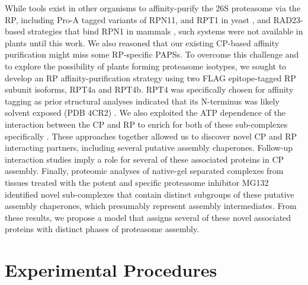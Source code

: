 	While tools exist in other organisms to affinity-purify the 26S proteasome via the RP, including Pro-A tagged variants of RPN11, and RPT1 in yeast \citep{leggett05, leggett02}, and RAD23-based strategies that bind RPN1 in mammals \citep{besche09}, such systems were not available in plants until this work. We also reasoned that our existing CP-based affinity purification might miss some RP-specific PAPSs. To overcome this challenge and to explore the possibility of plants forming proteasome isotypes, we sought to develop an RP affinity-purification strategy using two FLAG epitope-tagged RP subunit isoforms, RPT4a and RPT4b. RPT4 was specifically chosen for affinity tagging as prior structural analyses indicated that its N-terminus was likely solvent exposed (PDB 4CR2) \citep{beck12}.   We also exploited the ATP dependence of the interaction between the CP and RP to enrich for both of these sub-complexes specifically \citep{book10, liu06}. These approaches together allowed us to discover novel CP and RP interacting partners, including several putative assembly chaperones. Follow-up interaction studies imply a role for several of these associated proteins in CP assembly. Finally, proteomic analyses of native-gel separated complexes from tissues treated with the potent and specific proteasome inhibitor MG132 identified novel sub-complexes that contain distinct subgroups of these putative assembly chaperones, which presumably represent assembly intermediates. From these results, we propose a model that assigns several of these novel associated proteins with distinct phases of proteasome assembly.
 
\section{Experimental Procedures}

